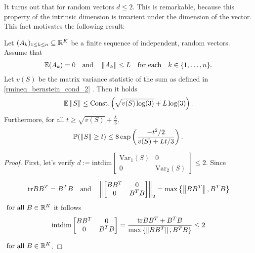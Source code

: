 It turns out that for random vectors $ d \le 2 $. This is remarkable, because this property of the intrinsic dimension is invarient under the dimension of the vector. This fact motivates the following result:
\begin{corollary}
  Let $(A_k)_{1\le k \le n}\subseteq\mathbb{R}^{K}$ be a finite sequence of independent, random vectors. Assume that
    \begin{gather}
      \label{rmineq_bernstein_cond_1}
      \mathbb{E}(A_k)=0\quad\text{and}\quad\left\lVert A_k\right\rVert\le L \quad \text{for each}\quad  k\in \{1,\ldots,n\}.
    \end{gather}
    Let $v(S)$ be the matrix variance statistic of the sum 
    as defined in
    \eqref{rmineq_bernstein_cond_2}
    .
  Then 
  it holds
      \begin{align}
        \label{rmineq_intrinsic_bernstein_expectation_bound}
        \mathbb{E}\left\lVert S\right\rVert\le \text{Const.}\left( \sqrt{v(S)\log(3)} + L\log(3) \right).
      \end{align}
    Furthermore, for all 
  $
    t
    \ge
    \sqrt{v(S)}
    +
    \frac{L}{3}
  $,
      \begin{gather}
        \label{rmineq_intrinsic_bernstein_probability_bound}
        \mathbb{P}(\left\lVert S\right\rVert\ge t)\le 8 \exp\left(\frac{-t^2/2}{v(S)+Lt/3} \right).
      \end{gather}
\end{corollary}
\begin{proof}
  First, let's verify 
  $
    d
    :=
    \text{intdim}
    \begin{bmatrix}
      \text{Var}_1(S) & 0 \\
      0   & \text{Var}_2(S)
    \end{bmatrix}
    \le
    2
  $.
  Since
 
  \begin{gather}
  \text{tr} 
  B B^T 
  =
  B^T B
  \quad
  \text{and}
  \quad
  \left\lVert
    \begin{bmatrix}
      B B^T & 0 \\
      0   & B^T B
    \end{bmatrix}
  \right\rVert_2
  =
  \max
  \left\{ 
    \left\lVert B B^T\right\rVert,
    B^T B
  \right\}
  \end{gather}
  $
  \text{
  for all 
  }
  B \in \mathbb{R}^K
  $
  it follows
  \begin{align}
    \text{intdim} 
    \begin{bmatrix}
      B B^T & 0 \\
      0   & B^T B
    \end{bmatrix}
    =
  \frac{
    \text{tr}B B^T
    +
    B^T B
  }
  {
  \max
  \left\{ 
    \left\lVert B B^T\right\rVert,
    B^T B
  \right\}
  }
  \le
  2  
  \end{align}

$
  \text{
  for all 
  }
  B \in \mathbb{R}^K
$.
\end{proof}
